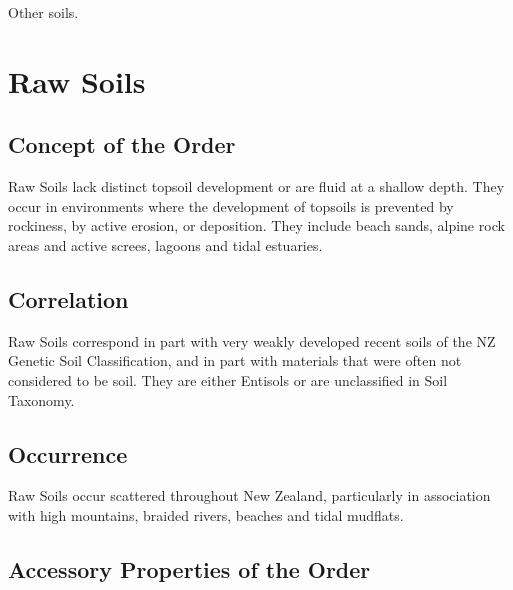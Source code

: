 \documentclass[
  letterpaper,
  DIV=11,
  numbers=noendperiod]{scrreprt}
\begin{document}
Other soils.


\hypertarget{sec-ord-W}{%
\chapter{Raw Soils}\label{sec-ord-W}}

\hypertarget{sec-con-W}{%
\section{Concept of the Order}\label{sec-con-W}}

Raw Soils lack distinct topsoil development or are fluid at a shallow
depth. They occur in environments where the development of topsoils is
prevented by rockiness, by active erosion, or deposition. They include
beach sands, alpine rock areas and active screes, lagoons and tidal
estuaries.

\hypertarget{sec-cor-W}{%
\section{Correlation}\label{sec-cor-W}}

Raw Soils correspond in part with very weakly developed recent soils of
the NZ Genetic Soil Classification, and in part with materials that were
often not considered to be soil. They are either Entisols or are
unclassified in Soil Taxonomy.

\hypertarget{sec-occ-W}{%
\section{Occurrence}\label{sec-occ-W}}

Raw Soils occur scattered throughout New Zealand, particularly in
association with high mountains, braided rivers, beaches and tidal
mudflats.

\hypertarget{sec-acc-W}{%
\section{Accessory Properties of the Order}\label{sec-acc-W}}
\end{document}
